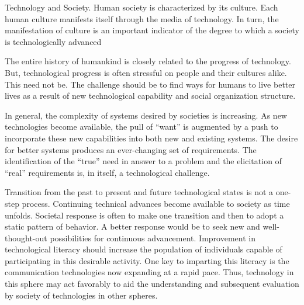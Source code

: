 Technology and Society. Human society is characterized by its culture. Each human culture manifests itself through the media of technology. In turn, the manifestation of culture is an important indicator of the degree to which a society is technologically advanced

The entire history of humankind is closely related to the progress of technology. But, technological progress is often stressful on people and their cultures alike. This need not be. The challenge should be to find ways for humans to live better lives as a result of new technological capability and social organization structure.

In general, the complexity of systems desired by societies is increasing. As new technologies become available, the pull of ``want'' is augmented by a push to incorporate these new capabilities into both new and existing systems. The desire for better systems produces an ever-changing set of requirements. The identification of the ``true'' need in answer to a problem and the elicitation of ``real'' requirements is, in itself, a technological challenge.

Transition from the past to present and future technological states is not a one-step process. Continuing technical advances become available to society as time unfolds. Societal response is often to make one transition and then to adopt a static pattern of behavior. A better response would be to seek new and well-thought-out possibilities for continuous advancement. Improvement in technological literacy should increase the population of individuals capable of participating in this desirable activity. One key to imparting this literacy is the communication technologies now expanding at a rapid pace. Thus, technology in this sphere may act favorably to aid the understanding and subsequent evaluation by society of technologies in other spheres.